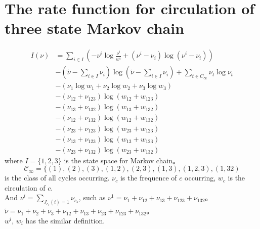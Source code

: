 \documentclass[a4paper,11pt]{article}
\begin{document}
\section{The rate function for circulation of three state Markov chain}
\begin{align*}
    I(\nu) 
    &= \sum_{i \in I} \left(-\nu^{i} \log \frac{\nu^{i}}{w^{i}} + (\nu^{i} - \nu_{i}) \log(\nu^{i} - \nu_{i})\right) \\
    &-(\tilde{\nu} - \sum_{i \in I} \nu_i) \log (\tilde{\nu} - \sum_{i \in I} \nu_i)
    +\sum_{t \in C_{\infty}} \nu_t \log \nu_t \\
    &- (\nu_{1} \log w_{1} + \nu_{2} \log w_{2} + \nu_{3} \log w_{3})\\
    &- (\nu_{12} + \nu_{123}) \log(w_{12} + w_{123}) \\
    &- (\nu_{13} + \nu_{132}) \log(w_{13} + w_{132}) \\
    &- (\nu_{12} + \nu_{132}) \log(w_{12} + w_{132}) \\
    &- (\nu_{23} + \nu_{123}) \log(w_{23} + w_{123}) \\
    &- (\nu_{13} + \nu_{123}) \log(w_{13} + w_{123}) \\
    &- (\nu_{23} + \nu_{132}) \log(w_{23} + w_{132}) 
\end{align*}
where $I=\{1, 2, 3\}$ is the state space for Markov chain。
$$\mathcal{C}_{\infty} = \{(1), (2), (3), (1,2), (2,3), (1,3), (1,2,3), (1, 32)$$
is the class of all cycles occurring.
$\nu_c$ is the frequence of $c$ occurring, $w_c$ is the circulation of $c$.\\
And $\nu^{i} = \sum_{J_{c_s}(i)=1} \nu_{c_s}$, such as $\nu^{1} = \nu_{1} + \nu_{12} + \nu_{13} + \nu_{123} +\nu_{132}$。
$\tilde{\nu} = \nu_{1} + \nu_{2} + \nu_{3} + \nu_{12} + \nu_{13} + \nu_{23} + \nu_{123} +\nu_{132}$。\\
$w^i$, $w_i$ has the similar definition.
\end{document}
